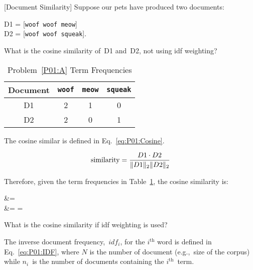\begin{problem}
   \textnormal{[Document Similarity]} Suppose our pets have produced two documents:

  D1 = [\texttt{woof woof meow}] \\ D2 = [\texttt{woof woof squeak}].
\end{problem}

\begin{subproblem}\label{P01:A}
   What is the cosine similarity of~D1 and~D2, not using idf weighting?
\end{subproblem}

  \begin{table}[h]
    \centering
    \caption{Problem~\ref{P01:A} Term Frequencies}\label{tab:P01:TermFreq}
    \begin{tabular}{|c|c|c|c|}
      \hline
      \textbf{Document} & \texttt{woof} & \texttt{meow} & \texttt{squeak} \\\hline\hline
      D1                & 2             & 1             & 0 \\\hline
      D2                & 2             & 0             & 1 \\\hline
    \end{tabular}
  \end{table}

The cosine similar is defined in Eq.~\eqref{eq:P01:Cosine}.

\begin{equation}\label{eq:P01:Cosine}
  \text{similarity} = \frac{D1 \cdot D2}{\lVert D1\rVert_{2}\lVert D2\rVert_{2}}
\end{equation}

\noindent
Therefore, given the term frequencies in Table~\ref{tab:P01:TermFreq}, the cosine similarity is:

\begin{aligncustom}
   &=  \\
                    &=  =  
\end{aligncustom}

\begin{subproblem}\label{P01:B}
   What is the cosine similarity if idf weighting is used?
\end{subproblem}

The inverse document frequency,~$idf_i$, for the $i^{\text{th}}$ word is defined in Eq.~\eqref{eq:P01:IDF}, where $N$ is the number of document (e.g.,~size of the corpus) while $n_i$~is the number of documents containing the $i^{\text{th}}$~term.

